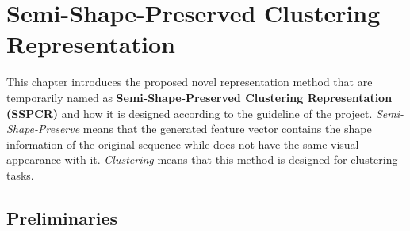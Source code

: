 \chapter{Semi-Shape-Preserved Clustering Representation}
This chapter introduces the proposed novel representation method that are temporarily named as \textbf{Semi-Shape-Preserved Clustering Representation (SSPCR)} and how it is designed according to the guideline of the project. \emph{Semi-Shape-Preserve} means that the generated feature vector contains the shape information of the original sequence while does not have the same visual appearance with it. \emph{Clustering} means that this method is designed for clustering tasks.

\section{Preliminaries}
